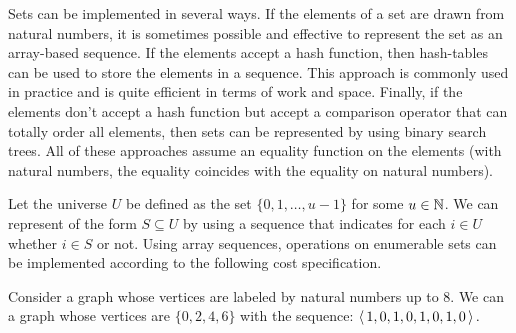 \begin{gram}
Sets can be implemented in several ways. 
%
If the elements of a set are drawn from natural numbers, it is sometimes possible and effective to represent the set as an array-based sequence.
%
If the elements accept a hash function, then hash-tables can be used to store the elements in a sequence.  This approach is commonly used in practice and is quite efficient in terms of work and space.
%
Finally, if the elements don't accept a hash function but accept a comparison operator that can totally order all elements, then sets can be represented by using binary search trees.
%
All of these approaches assume an equality function on the elements (with natural numbers, the equality coincides with the equality on natural numbers).

%
\end{gram}

\begin{flex}
\begin{costspec}
\label{XXcost:sets::arrayseqs}

Let the universe $U$ be defined as the set 
%
$\{ 0, 1, \ldots, u-1 \}$
%
for some $u \in \mathbb{N}$.
%
We can represent  of the form $S \subseteq U$ by using a sequence that indicates for each $i \in U$ whether $i \in S$ or not.
%
Using array sequences, operations on enumerable sets can be implemented according to the following cost specification.
 

\end{costspec}


\begin{example}
Consider a graph whose vertices are labeled by natural numbers up to $8$.  We can a graph whose vertices are
%
$\{ 0, 2, 4, 6 \}$ 
%
with the sequence:
%
$\left\langle\,  1, 0, 1, 0, 1, 0, 1, 0  \,\right\rangle.$ 
\end{example}

\end{flex}


